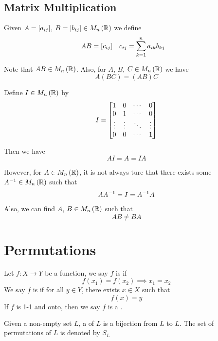 \subsection{Matrix Multiplication}
Given $A=\left[a_{ij}\right]$, $B=\left[b_{ij}\right] \in M_{n}\left(\mathbb{R}\right)$ we define
\begin{align*}
  AB & = \left[c_{ij}\right] & c_{ij} &= \sum_{k=1}^na_{ik}b_{kj}
\end{align*}

Note that $AB \in M_{n}\left(\mathbb{R}\right)$. Also, for $A$, $B$, $C \in M_{n}\left(\mathbb{R}\right)$ we have
$$A(BC) = (AB)C$$

Define $I \in M_{n}\left(\mathbb{R}\right)$ by
$$I = \begin{bmatrix}
  1 & 0 & \cdots & 0 \\
  0 & 1 & \cdots & 0 \\
  \vdots & \vdots & \ddots & \vdots \\
  0 & 0 & \cdots & 1
\end{bmatrix}$$

Then we have
$$AI = A = IA$$

However, for $A \in M_{n}\left(\mathbb{R}\right)$, it is not always ture that there exists some
${{A}^{-1}} \in M_{n}\left(\mathbb{R}\right)$ such that
$$A{{A}^{-1}} = I = {{A}^{-1}}A$$

Also, we can find $A$, $B \in M_{n}\left(\mathbb{R}\right)$ such that
$$AB \ne BA$$


\section{Permutations}

\begin{definition}
  Let $f : X \to Y$ be a function, we say $f$ is  if
  $$f(x_1) = f(x_2) \implies x_1 = x_2$$
  We say $f$ is  if for all $y \in Y$, there exists $x \in X$
  such that
  $$f(x) = y$$
  If $f$ is 1-1 and onto, then we say $f$ is a .
\end{definition}

\begin{definition}
  Given a non-empty set $L$, a  of $L$ is a bijection from
  $L$ to $L$. The set of permutations of $L$ is denoted by $S_L$
\end{definition}
